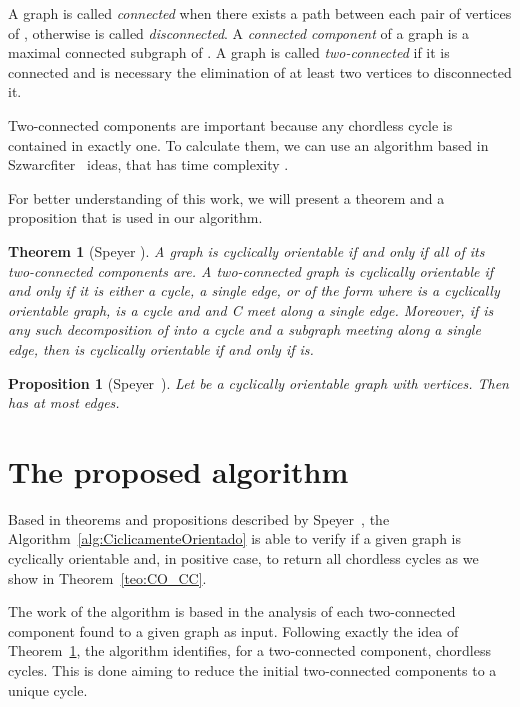 \documentclass{lawcg}
\newtheorem{theorem}{Theorem}
\newtheorem{proposition}{Proposition}
\begin{document}
A graph  is called \textit{connected} when there exists a path between each pair of vertices of , otherwise  is called {\it disconnected}. A {\it connected component} of a graph  is a maximal connected subgraph of . A graph is called {\it two-connected} if it is connected and is necessary the elimination of at least two vertices to disconnected it.

Two-connected components are important because any chordless cycle is contained in exactly one. To calculate them, we can use an algorithm based in Szwarcfiter~\cite{S1988} ideas, that has time complexity .

For better understanding of this work, we will present a theorem and a proposition that is used in our algorithm.



\begin{theorem} [Speyer \cite{S2005}] \label{teo1_Speyer}
A graph  is cyclically orientable if and only if all of its two-connected
components are. A two-connected graph is cyclically orientable if and only if it is either a cycle, a single edge, or of the form  where  is a cyclically orientable graph,  is a cycle and  and C meet along a single edge. Moreover, if  is any such decomposition of  into a cycle and a subgraph meeting along a single edge, then  is cyclically orientable if and only if  is.
\end{theorem}

\begin{proposition} [Speyer~\cite{S2005}] \label{prop:LimiteDeArestas}
Let  be a cyclically orientable graph with  vertices. Then  has at
most  edges.
\end{proposition}










\section{The proposed algorithm}
\label{sec:Algorithm}

Based in theorems and propositions described by Speyer~\cite{S2005}, the Algorithm~\ref{alg:CiclicamenteOrientado} is able to verify if a given graph  is cyclically orientable and, in positive case, to return all chordless cycles as we show in Theorem~\ref{teo:CO_CC}.

The work of the algorithm is based in the analysis of each two-connected component found to a given graph as input. Following exactly the idea of Theorem~\ref{teo1_Speyer}, the algorithm identifies, for a two-connected component, chordless cycles. This is done aiming to reduce the initial two-connected components to a unique cycle.
\end{document}

